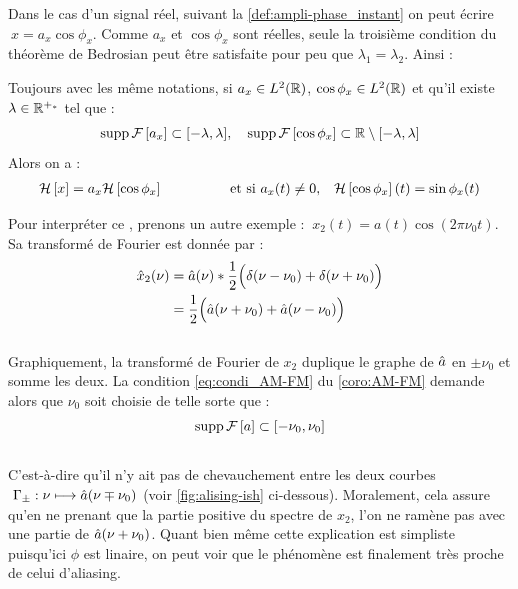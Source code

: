 Dans le cas d'un signal réel, suivant la \cref{def:ampli-phase_instant} on peut écrire $\ x=a_x\cos \phi_x$.
Comme $a_x$ et $\cos \phi_x$ sont réelles, seule la troisième condition du théorème de Bedrosian peut être satisfaite pour peu que $\lambda_1=\lambda_2$. Ainsi :

\begin{corollaire}\label{coro:AM-FM}
	Toujours avec les même notations, si $a_x\in L^2(\mathbb{R})$, $\cos\phi_x\in L^2(\mathbb{R})$ et qu'il existe $\lambda\in\mathbb{R}^{+_*}$ tel que :
	\begin{equation}\label{eq:condi_AM-FM}
		\text{\normalfont supp}\, \mathcal{F}\left[a_x\right] \subset [-\lambda, \lambda],\quad \text{\normalfont supp}\, \mathcal{F}\left[\cos\phi_x\right] \subset \mathbb{R}\setminus[-\lambda,\lambda]
	\end{equation}
	Alors on a :
	\begin{align}\label{eq:result_AM-FM}
		\mathcal{H}\left[x\right] &= a_x\mathcal{H}\left[\cos \phi_x\right]  &  \qquad\qquad&\text{et si }a_x(t)\neq 0,  &  \mathcal{H}\left[\cos \phi_x\right](t) = \sin\phi_x(t)
	\end{align}
\end{corollaire}
\skipl

Pour interpréter ce , prenons un autre exemple : $\ x_2(t) = a(t)\cos(2\pi \nu_0 t)$. Sa transformé de Fourier est donnée par :
\begin{align*}
	\hat{x}_2(\nu) &= \hat{a}(\nu)*\frac{1}{2}\Big(\delta(\nu-\nu_0) + \delta(\nu+\nu_0)\Big) \\
	&= \frac{1}{2}\Big(\hat{a}(\nu+\nu_0) + \hat{a}(\nu-\nu_0)\Big)
\end{align*}
\\
Graphiquement, la transformé de Fourier de $x_2$ duplique le graphe de $\hat{a}$ en $\pm\nu_0$ et somme les deux. La condition \eqref{eq:condi_AM-FM} du \cref{coro:AM-FM} demande alors que $\nu_0$ soit choisie de telle sorte que :
\[\text{\normalfont supp}\, \mathcal{F}\left[a\right]\subset[-\nu_0, \nu_0]\]
\\
C'est-à-dire qu'il n'y ait pas de chevauchement entre les deux courbes $\ \Gamma_\pm : \nu \longmapsto \hat{a}(\nu\mp\nu_0) $ (voir \cref{fig:alising-ish} ci-dessous). Moralement, cela assure qu'en ne prenant que la partie positive du spectre de $x_2$, l'on ne ramène pas avec une partie de $\hat{a}(\nu+\nu_0)$. Quant bien même cette explication est simpliste puisqu'ici $\phi$ est linaire, on peut voir que le phénomène est finalement très proche de celui d'aliasing.
\\

